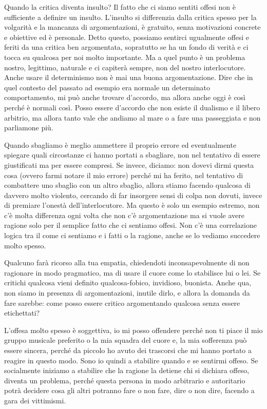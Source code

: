 \documentclass[12pt]{book} %
\begin{document}
Quando la critica diventa insulto? Il fatto che ci siamo sentiti offesi non è sufficiente a definire un insulto.
L'insulto si differenzia dalla critica spesso per la volgarità e la mancanza di argomentazioni, è
gratuito, senza motivazioni concrete e obiettive ed è personale. Detto questo, possiamo sentirci ugualmente offesi e feriti da una
critica ben argomentata, sopratutto se ha un fondo di verità e ci tocca su qualcosa per noi molto importante. Ma a quel
punto è un problema nostro, legittimo, naturale e ci capiterà sempre, non del nostro interlocutore. 
Anche usare il determinismo non è mai una buona argomentazione. Dire che in quel contesto del passato ad esempio era normale un determinato comportamento, mi può anche trovare d'accordo, ma allora anche oggi è così perché è normali così. Posso essere d'accordo che non esiste il dualismo e il libero arbitrio, ma allora tanto vale che andiamo al mare o a fare una passeggiata e non parliamone più.

Quando sbagliamo è meglio ammettere il proprio errore ed eventualmente spiegare quali circostanze
ci hanno portati a sbagliare, non nel tentativo di essere giustificati ma per essere compresi. Se
invece, diciamo: non dovevi dirmi questa cosa (ovvero farmi notare il mio errore) perché
mi ha ferito, nel tentativo di combattere uno sbaglio con un altro sbaglio, allora stiamo facendo qualcosa di davvero
molto violento, cercando di far insorgere sensi di colpa non dovuti, invece di premiare l'onestà
dell'interlocutore. Ma questo è solo un esempio estremo, non c'è molta differenza ogni volta
che non c'è argomentazione ma si vuole avere ragione solo per il semplice fatto che ci sentiamo
offesi. Non c'è una correlazione logica tra il come ci sentiamo e i fatti o la ragione, anche se
lo vediamo succedere molto spesso.

Qualcuno farà ricorso alla tua empatia, chiedendoti inconsapevolmente di non ragionare in modo pragmatico, ma di usare il cuore come lo stabilisce lui o lei. Se critichi qualcosa vieni definito qualcosa-fobico, invidioso, buonista. Anche qua, non siamo in presenza di argomentazioni, inutile dirlo, e allora la domanda da fare sarebbe: come posso essere critico argomentando qualcosa senza essere etichettati?

L'offesa molto spesso è soggettiva, io mi posso offendere perché non ti piace il mio gruppo musicale preferito o la mia
squadra del cuore e, la mia sofferenza può essere sincera, perché da piccolo ho avuto dei trascorsi che mi hanno
portato a reagire in questo modo. Sono io quindi a stabilire quando e se sentirmi offeso. Se socialmente iniziamo a
stabilire che la ragione la detiene chi si dichiara offeso, diventa un problema, perché questa persona in modo
arbitrario e autoritario potrà decidere cosa gli altri potranno fare o non fare, dire o non dire, facendo a gara dei
vittimismi.
\end{document}
